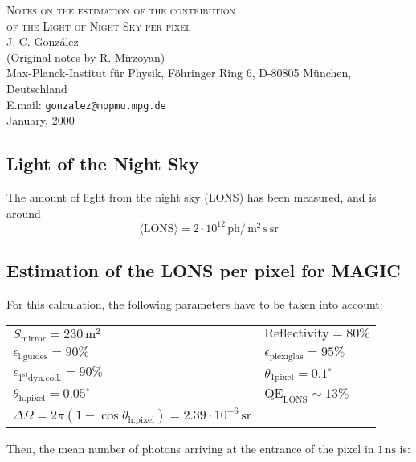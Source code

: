 \documentclass{article}
\renewcommand{\u}[1]{\ensuremath{\mathrm{\,#1}}}  %
\begin{document}
\begin{center}
  {\large \scshape Notes on the estimation of the contribution\\
                  of the Light of Night Sky per pixel\\}
  J. C. Gonz\'alez\\
  (Original notes by R. Mirzoyan)\\
  {\small Max-Planck-Institut f\"ur Physik, 
  F\"ohringer Ring 6, D-80805 M\"unchen, Deutschland\\
  E.mail: \texttt{gonzalez@mppmu.mpg.de}\\}
  January, 2000
\end{center}
\vskip 1cm


\subsection*{Light of the Night Sky}

The amount of light from the night sky (LONS) has been measured, and
is around 
\[
\langle\mathrm{LONS}\rangle = 2\cdot 10^{12} \u{ph}/\u{m}^2\u{s}\u{sr}
\]

\subsection*{Estimation of the LONS per pixel for MAGIC}

For this calculation, the following parameters have to be taken into
account:

\begin{center}
\begin{tabular}{ll}
$S_{\text{mirror}} = 230 \u{m}^2 $ &
$\text{Reflectivity} = 80\% $ \\
$\epsilon_{\text{l.guides}} = 90\% $ &
$\epsilon_{\text{plexiglas}} = 95\% $ \\
$\epsilon_{1^{\mathrm{st}}\text{dyn.coll.}} = 90\%$ &
$\theta_{\text{1pixel}} = 0.1^\circ$ \\
$\theta_{\text{h.pixel}} = 0.05^\circ$ &
$\mathrm{QE}_{\mathrm{LONS}} \sim 13\% $ \\
$\Delta\Omega = 2\pi(1-\cos\theta_{\text{h.pixel}}) 
= 2.39\cdot 10^{-6} \u{sr}$ \\
\end{tabular}
\end{center}

Then, the mean number of photons arriving at the entrance of the pixel
in $1\u{ns}$ is:
\end{document}
